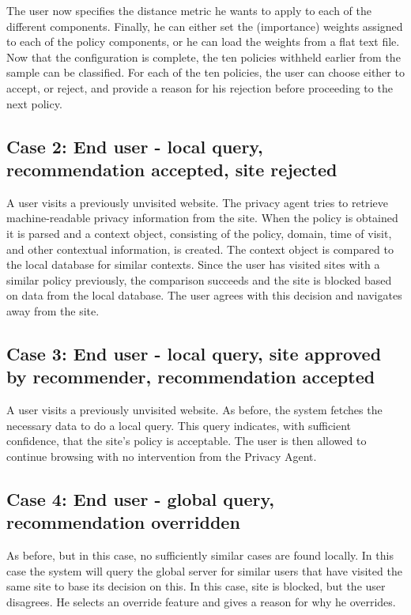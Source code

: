 The user now specifies the distance metric he wants to apply to each of the different components. Finally, he can either set the (importance) weights assigned to each of the policy components, or he can load the weights from a flat text file. Now that the configuration is complete, the ten policies withheld earlier from the sample can be classified. For each of the ten policies, the user can choose either to accept, or reject, and provide a reason for his rejection before proceeding to the next policy. 

\subsection{Case 2: End user - local query, recommendation accepted, site rejected}
A user visits a previously unvisited website. The privacy agent tries to retrieve machine-readable privacy information from the site. When the policy is obtained it is parsed and a context object, consisting of the policy, domain, time of visit, and other contextual information, is created. The context object is compared to the local database for similar contexts. Since the user has visited sites with a similar policy previously, the comparison succeeds and the site is blocked based on data from the local database. The user agrees with this decision and navigates away from the site.

\subsection{Case 3: End user - local query, site approved by recommender, recommendation accepted}
A user visits a previously unvisited website. As before, the system fetches the necessary data to do a local query. This query indicates, with sufficient confidence, that the site's policy is acceptable. The user is then allowed to continue browsing with no intervention from the Privacy Agent.

\subsection{Case 4: End user - global query, recommendation overridden}
As before, but in this case, no sufficiently similar cases are found locally. In this case the system will query the global server for similar users that have visited the same site to base its decision on this. In this case, site is blocked, but the user disagrees. He selects an override feature and gives a reason for why he overrides.

